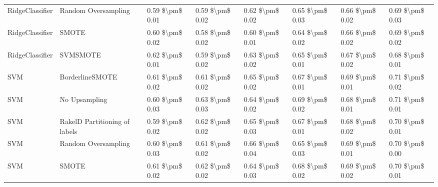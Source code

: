 \begin{tabular}{llllllll}
                RidgeClassifier &           Random Oversampling &     0.59 \$\textbackslash pm\$ 0.01 &           0.59 \$\textbackslash pm\$ 0.02 &       0.62 \$\textbackslash pm\$ 0.02 &        0.65 \$\textbackslash pm\$ 0.03 &                         0.66 \$\textbackslash pm\$ 0.02 &     0.69 \$\textbackslash pm\$ 0.03 \\
                RidgeClassifier &                         SMOTE &     0.60 \$\textbackslash pm\$ 0.02 &           0.58 \$\textbackslash pm\$ 0.02 &       0.60 \$\textbackslash pm\$ 0.01 &        0.64 \$\textbackslash pm\$ 0.02 &                         0.66 \$\textbackslash pm\$ 0.02 &     0.69 \$\textbackslash pm\$ 0.02 \\
                RidgeClassifier &                      SVMSMOTE &     0.62 \$\textbackslash pm\$ 0.01 &           0.59 \$\textbackslash pm\$ 0.02 &       0.63 \$\textbackslash pm\$ 0.02 &        0.65 \$\textbackslash pm\$ 0.01 &                         0.67 \$\textbackslash pm\$ 0.02 &     0.68 \$\textbackslash pm\$ 0.01 \\
                            SVM &               BorderlineSMOTE &     0.61 \$\textbackslash pm\$ 0.02 &           0.61 \$\textbackslash pm\$ 0.02 &       0.65 \$\textbackslash pm\$ 0.02 &        0.67 \$\textbackslash pm\$ 0.01 &                         0.69 \$\textbackslash pm\$ 0.01 &     0.71 \$\textbackslash pm\$ 0.02 \\
                            SVM &                 No Upsampling &     0.60 \$\textbackslash pm\$ 0.03 &           0.63 \$\textbackslash pm\$ 0.03 &       0.64 \$\textbackslash pm\$ 0.02 &        0.69 \$\textbackslash pm\$ 0.02 &                         0.68 \$\textbackslash pm\$ 0.01 &     0.71 \$\textbackslash pm\$ 0.01 \\
                            SVM & RakelD Partitioning of labels &     0.59 \$\textbackslash pm\$ 0.02 &           0.62 \$\textbackslash pm\$ 0.02 &       0.65 \$\textbackslash pm\$ 0.03 &        0.67 \$\textbackslash pm\$ 0.01 &                         0.68 \$\textbackslash pm\$ 0.02 &     0.70 \$\textbackslash pm\$ 0.01 \\
                            SVM &           Random Oversampling &     0.60 \$\textbackslash pm\$ 0.03 &           0.61 \$\textbackslash pm\$ 0.02 &       0.66 \$\textbackslash pm\$ 0.04 &        0.65 \$\textbackslash pm\$ 0.03 &                         0.69 \$\textbackslash pm\$ 0.01 &     0.70 \$\textbackslash pm\$ 0.00 \\
                            SVM &                         SMOTE &     0.61 \$\textbackslash pm\$ 0.02 &           0.62 \$\textbackslash pm\$ 0.02 &       0.64 \$\textbackslash pm\$ 0.03 &        0.68 \$\textbackslash pm\$ 0.02 &                         0.69 \$\textbackslash pm\$ 0.02 &     0.70 \$\textbackslash pm\$ 0.01 \\

\end{tabular}
